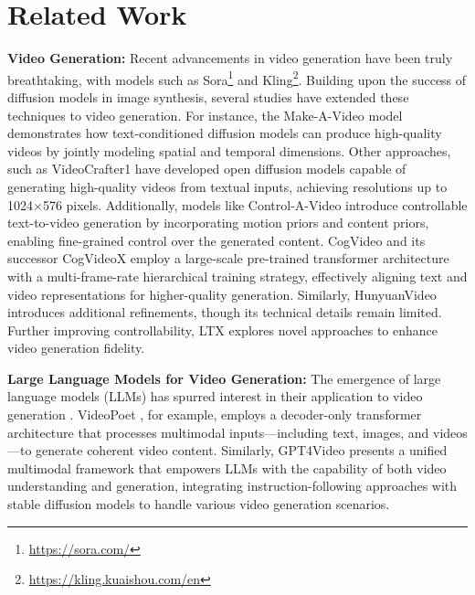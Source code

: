 \section{Related Work}
\noindent \textbf{Video Generation:} Recent advancements in video generation have been truly breathtaking, with models such as Sora\footnote{\url{https://sora.com/}} and Kling\footnote{\url{https://kling.kuaishou.com/en}}. Building upon the success of diffusion models in image synthesis, several studies have extended these techniques to video generation. For instance, the Make-A-Video model \cite{singer2022make} demonstrates how text-conditioned diffusion models can produce high-quality videos by jointly modeling spatial and temporal dimensions. Other approaches, such as VideoCrafter1 \cite{chen2023videocrafter1} have developed open diffusion models capable of generating high-quality videos from textual inputs, achieving resolutions up to 1024×576 pixels. Additionally, models like Control-A-Video \cite{chen2023control} introduce controllable text-to-video generation by incorporating motion priors and content priors, enabling fine-grained control over the generated content.  CogVideo \cite{hong2022cogvideo} and its successor CogVideoX \cite{yang2024cogvideox} employ a large-scale pre-trained transformer architecture with a multi-frame-rate hierarchical training strategy, effectively aligning text and video representations for higher-quality generation. Similarly, HunyuanVideo \cite{kong2024hunyuanvideo} introduces additional refinements, though its technical details remain limited. Further improving controllability, LTX \cite{HaCohen2024LTXVideo} explores novel approaches to enhance video generation fidelity.


\noindent \textbf{Large Language Models for Video Generation:} The emergence of large language models (LLMs) has spurred interest in their application to video generation \cite{zhao2023learning,hong2023large,maaz2023video}. VideoPoet \cite{kondratyuk2023videopoet}, for example, employs a decoder-only transformer architecture that processes multimodal inputs—including text, images, and videos—to generate coherent video content. Similarly, GPT4Video \cite{wang2024gpt4video} presents a unified multimodal framework that empowers LLMs with the capability of both video understanding and generation, integrating instruction-following approaches with stable diffusion models to handle various video generation scenarios.

